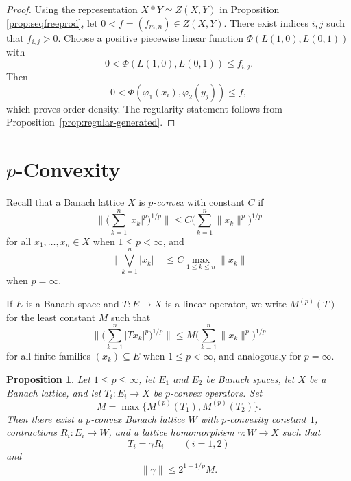 \documentclass[12pt]{amsart}
\theoremstyle{plain}
\newtheorem{proposition}[theorem]{Proposition}
\theoremstyle{definition}
\begin{document}
\begin{proof}
Using the representation $X\ast Y\simeq Z(X,Y)$ in Proposition \ref{prop:seqfreeprod}, let $0<f=(f_{m,n})\in Z(X,Y)$. There exist indices $i,j$ such that $f_{i,j}>0$. Choose a positive piecewise linear function $\Phi(L(1,0),L(0,1))$ with
\[
0<\Phi(L(1,0),L(0,1))\leq f_{i,j}.
\]
Then
\[
0<\Phi(\varphi_1(x_i),\varphi_2(y_j))\leq f,
\]
which proves order density. The regularity statement follows from Proposition~\ref{prop:regular-generated}.
\end{proof}
\section{$p$-Convexity}\label{sec:pconvex}

Recall that a Banach lattice $X$ is \emph{$p$-convex} with constant $C$ if
\[
\Big\|\Big(\sum_{k=1}^n |x_k|^p\Big)^{1/p}\Big\|
\leq
C\Big(\sum_{k=1}^n \|x_k\|^p\Big)^{1/p}
\]
for all $x_1,\dots,x_n\in X$ when $1\leq p<\infty$, and
\[
\Big\|\bigvee_{k=1}^n |x_k|\Big\|
\leq
C\max_{1\leq k\leq n}\|x_k\|
\]
when $p=\infty$.

If $E$ is a Banach space and $T:E\to X$ is a linear operator, we write $M^{(p)}(T)$ for the least constant $M$ such that
\[
\Big\|\Big(\sum_{k=1}^n |Tx_k|^p\Big)^{1/p}\Big\|
\leq
M\Big(\sum_{k=1}^n \|x_k\|^p\Big)^{1/p}
\]
for all finite families $(x_k)\subseteq E$ when $1\leq p<\infty$, and analogously for $p=\infty$.

\begin{proposition}\label{prop:pconvex-factorization}
Let $1\leq p\leq \infty$, let $E_1$ and $E_2$ be Banach spaces, let $X$ be a Banach lattice, and let $T_i:E_i\to X$ be $p$-convex operators. Set
\[
M=\max\{M^{(p)}(T_1),M^{(p)}(T_2)\}.
\]
Then there exist a $p$-convex Banach lattice $W$ with $p$-convexity constant $1$, contractions $R_i:E_i\to W$, and a lattice homomorphism $\gamma:W\to X$ such that
\[
T_i=\gamma R_i
\qquad (i=1,2)
\]
and
\[
\|\gamma\|\leq 2^{1-1/p}M.
\]
\end{proposition}
\end{document}
